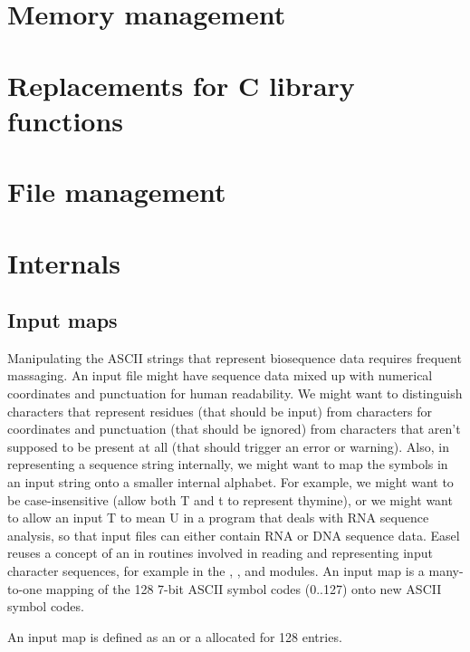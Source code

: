 \section{Memory management}


\section{Replacements for C library functions}


\section{File management}


\section{Internals}

\subsection{Input maps}

Manipulating the ASCII strings that represent biosequence data
requires frequent massaging. An input file might have sequence data
mixed up with numerical coordinates and punctuation for human
readability. We might want to distinguish characters that represent
residues (that should be input) from characters for coordinates and
punctuation (that should be ignored) from characters that aren't
supposed to be present at all (that should trigger an error or
warning). Also, in representing a sequence string internally, we might
want to map the symbols in an input string onto a smaller internal
alphabet. For example, we might want to be case-insensitive (allow
both T and t to represent thymine), or we might want to allow an input
T to mean U in a program that deals with RNA sequence analysis, so
that input files can either contain RNA or DNA sequence data.  Easel
reuses a concept of an  in routines involved in
reading and representing input character sequences, for example in the
, , and  modules. An input
map is a many-to-one mapping of the 128 7-bit ASCII symbol codes
(0..127) onto new ASCII symbol codes.

An input map is defined as an  or a
 allocated for 128 entries. 
